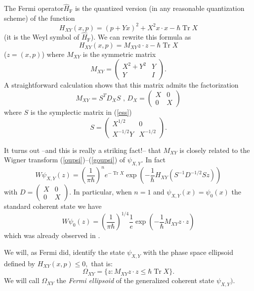 \documentclass[11pt]{article}%
\begin{document}
The Fermi operator$\widehat{H}_{\mathrm{F}}$ is the quantized version (in any
reasonable quantization scheme) of the function
\begin{equation}
H_{XY}(x,p)=(p+Yx)^{2}+X^{2}x\cdot x-\hbar\operatorname*{Tr}X \label{gf3}%
\end{equation}
(it is the Weyl symbol of $\widehat{H}_{\mathrm{F}}$). We can rewrite this
formula as
\[
H_{XY}(x,p)=M_{XY}z\cdot z-\hbar\operatorname*{Tr}X
\]
($z=(x,p)$) where $M_{XY}$ is the symmetric matrix
\begin{equation}
M_{XY}=%
\begin{pmatrix}
X^{2}+Y^{2} & Y\\
Y & I
\end{pmatrix}
. \label{mf}%
\end{equation}
A straightforward calculation shows that this matrix admits the factorization%
\begin{equation}
M_{XY}=S^{T}D_{X}S\text{ \ , \ }D_{X}=%
\begin{pmatrix}
X & 0\\
0 & X
\end{pmatrix}
\label{mfs}%
\end{equation}
where $S$ is the symplectic matrix in (\ref{ess}) \
\begin{equation}
S=%
\begin{pmatrix}
X^{1/2} & 0\\
X^{-1/2}Y & X^{-1/2}%
\end{pmatrix}
. \label{sxy}%
\end{equation}


It turns out --and this is really a striking fact!-- that $M_{XY}$ is closely
related to the Wigner transform (\ref{oupsi})--(\ref{goupsi}) of $\psi_{X,Y}$.
In fact%
\begin{equation}
W\psi_{X,Y}(z)=\left(  \frac{1}{\pi\hbar}\right)  ^{n}e^{-\operatorname*{Tr}%
X}\exp\left(  -\frac{1}{\hbar}H_{XY}(S^{-1}D^{-1/2}Sz)\right)  \label{wgf}%
\end{equation}
with $D=%
\begin{pmatrix}
X & 0\\
0 & X
\end{pmatrix}
$. In particular, when $n=1$ and $\psi_{X,Y}(x)=\psi_{0}(x)$ the standard
coherent state we have%
\[
W\psi_{0}(z)=\left(  \frac{1}{\pi\hbar}\right)  ^{1/4}\frac{1}{e}\exp\left(
-\frac{1}{\hbar}M_{XY}z\cdot z\right)
\]
which was already observed in \cite{best}.

We will, as Fermi did, identify the state $\psi_{X,Y}$ with the phase space
ellipsoid defined by $H_{XY}(x,p)\leq0,$ that is:%
\begin{equation}
\Omega_{XY}=\{z:M_{XY}z\cdot z\leq\hbar\operatorname*{Tr}X\}. \label{Fermi1}%
\end{equation}
We will call $\Omega_{XY}$ the \textit{Fermi ellipsoid} of the generalized
coherent state $\psi_{X,Y})$.
\end{document}
